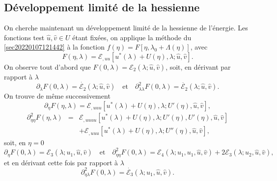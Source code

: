 \documentclass[12pt, final]{amsart}
\begin{document}
\subsection{Développement limité de la
hessienne}\label{sec20211115081016}

On cherche maintenant un développement limité de la hessienne de
l'énergie. Les fonctions test $\hat{u}, \hat{v} \in U$ étant
fixées, on applique la méthode du
{\textsection}\ref{sec20220107121442} {\`a} la fonction $f (\eta) = F [\eta,
\lambda_0 + \Lambda (\eta)]$, avec
\begin{equation}
  F (\eta, \lambda) =\mathcal{E}_{, u  u} [u^{\ast} (\lambda) + U
  (\eta), \lambda ; \hat{u}, \hat{v}] .
\end{equation}
On observe tout d'abord que $F (0, \lambda) =\mathcal{E}_2 (\lambda ; \hat{u},
\hat{v})$, soit, en dérivant par rapport {\`a} $\lambda$
\begin{equation}
  \partial_{\lambda} F (0, \lambda) = \dot{\mathcal{E}_2} (\lambda ; \hat{u},
  \hat{v}) \quad \text{et} \quad \partial_{\lambda  \lambda}^2 F (0,
  \lambda) = \ddot{\mathcal{E}_2} (\lambda ; \hat{u}, \hat{v}) .
\end{equation}
On trouve de m{\^e}me successivement
\begin{equation}
  \partial_{\eta} F (\eta, \lambda) =\mathcal{E}_{, u  u  u}
  [u^{\ast} (\lambda) + U (\eta), \lambda ; U' (\eta), \hat{u}, \hat{v}],
\end{equation}
\begin{eqnarray}
  \partial_{\eta  \eta}^2 F (\eta, \lambda) & = & \mathcal{E}_{, u
   u  u  u} [u^{\ast} (\lambda) + U (\eta), \lambda ;
  U' (\eta), U' (\eta), \hat{u}, \hat{v}] \nonumber\\
  &  & +\mathcal{E}_{, u  u  u} [u^{\ast} (\lambda) + U
  (\eta), \lambda ; U'' (\eta), \hat{u}, \hat{v}],
\end{eqnarray}
soit, en $\eta = 0$
\begin{equation}
  \partial_{\eta} F (0, \lambda) =\mathcal{E}_3 (\lambda ; u_1, \hat{u},
  \hat{v}) \quad \text{et} \quad \partial_{\eta  \eta}^2 F (0,
  \lambda) =\mathcal{E}_4 (\lambda ; u_1, u_1, \hat{u}, \hat{v}) +
  2\mathcal{E}_3 (\lambda ; u_2, \hat{u}, \hat{v}),
\end{equation}
et en dérivant cette fois par rapport {\`a} $\lambda$
\begin{equation}
  \partial_{\eta  \lambda}^2 F (0, \lambda) = \dot{\mathcal{E}_3}
  (\lambda ; u_1, \hat{u}, \hat{v}) .
\end{equation}
\end{document}
